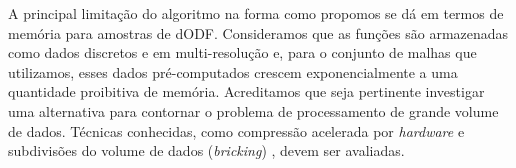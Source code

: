 \documentclass[
    12pt,                %
    oneside,            %
    a4paper,            %
    english,            %
    french,                %
    spanish,            %
    brazil                %
    ]{abntex2}
\begin{document}

A principal limitação  do algoritmo na forma como propomos se dá em termos de memória para amostras de dODF. Consideramos que as funções são armazenadas como dados discretos e em multi-resolução e, para o conjunto de malhas que utilizamos, esses dados pré-computados crescem exponencialmente a uma quantidade proibitiva de memória. Acreditamos que seja pertinente investigar uma alternativa para contornar o problema de processamento de grande volume de dados. Técnicas conhecidas, como compressão acelerada por \textit{hardware} \cite{sakharnykh2020} e subdivisões do volume de dados (\textit{bricking}) \cite{Beyer2014}, devem ser avaliadas.



\end{document}
